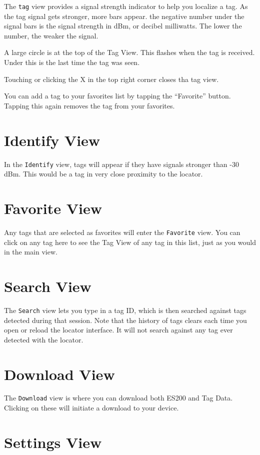 \documentclass[
]{article}
\begin{document}
The \texttt{tag} view provides a signal strength indicator to help you
localize a tag. As the tag signal gets stronger, more bars appear. the
negative number under the signal bars is the signal strength in dBm, or
decibel milliwatts. The lower the number, the weaker the signal.

A large circle is at the top of the Tag View. This flashes when the tag
is received. Under this is the last time the tag was seen.

Touching or clicking the X in the top right corner closes tha tag view.

You can add a tag to your favorites list by tapping the ``Favorite''
button. Tapping this again removes the tag from your favorites.

\hypertarget{identify-view}{%
\section{Identify View}\label{identify-view}}

In the \texttt{Identify} view, tags will appear if they have signals
stronger than -30 dBm. This would be a tag in very close proximity to
the locator.

\hypertarget{favorite-view}{%
\section{Favorite View}\label{favorite-view}}

Any tags that are selected as favorites will enter the \texttt{Favorite}
view. You can click on any tag here to see the Tag View of any tag in
this list, just as you would in the main view.

\hypertarget{search-view}{%
\section{Search View}\label{search-view}}

The \texttt{Search} view lets you type in a tag ID, which is then
searched against tags detected during that session. Note that the
history of tags clears each time you open or reload the locator
interface. It will not search against any tag ever detected with the
locator.

\hypertarget{download-view}{%
\section{Download View}\label{download-view}}

The \texttt{Download} view is where you can download both ES200 and Tag
Data. Clicking on these will initiate a download to your device.

\hypertarget{settings-view}{%
\section{Settings View}\label{settings-view}}
\end{document}
